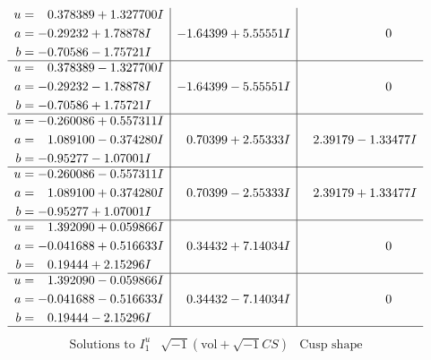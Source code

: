 \documentclass[1p]{elsarticle_modified}
\theoremstyle{definition}
\newcommand{\I}{\sqrt{-1}}
\begin{document}
$$\begin{array}{c|c|c}
\begin{aligned}
u &= \phantom{-}0.378389 + 1.327700 I \\
a &= -0.29232 + 1.78878 I \\
b &= -0.70586 - 1.75721 I\end{aligned}
 & -1.64399 + 5.55551 I & \phantom{-0.000000 } 0 \\ \hline\begin{aligned}
u &= \phantom{-}0.378389 - 1.327700 I \\
a &= -0.29232 - 1.78878 I \\
b &= -0.70586 + 1.75721 I\end{aligned}
 & -1.64399 - 5.55551 I & \phantom{-0.000000 } 0 \\ \hline\begin{aligned}
u &= -0.260086 + 0.557311 I \\
a &= \phantom{-}1.089100 - 0.374280 I \\
b &= -0.95277 - 1.07001 I\end{aligned}
 & \phantom{-}0.70399 + 2.55333 I & \phantom{-}2.39179 - 1.33477 I \\ \hline\begin{aligned}
u &= -0.260086 - 0.557311 I \\
a &= \phantom{-}1.089100 + 0.374280 I \\
b &= -0.95277 + 1.07001 I\end{aligned}
 & \phantom{-}0.70399 - 2.55333 I & \phantom{-}2.39179 + 1.33477 I \\ \hline\begin{aligned}
u &= \phantom{-}1.392090 + 0.059866 I \\
a &= -0.041688 + 0.516633 I \\
b &= \phantom{-}0.19444 + 2.15296 I\end{aligned}
 & \phantom{-}0.34432 + 7.14034 I & \phantom{-0.000000 } 0 \\ \hline\begin{aligned}
u &= \phantom{-}1.392090 - 0.059866 I \\
a &= -0.041688 - 0.516633 I \\
b &= \phantom{-}0.19444 - 2.15296 I\end{aligned}
 & \phantom{-}0.34432 - 7.14034 I & \phantom{-0.000000 } 0\\
 \hline 
 \end{array}$$\newpage$$\begin{array}{c|c|c}  
\text{Solutions to }I^u_{1}& \I (\text{vol} + \sqrt{-1}CS) & \text{Cusp shape}\\
 \hline 
\begin{aligned}

\end{aligned}
\end{array}$$
\end{document}
